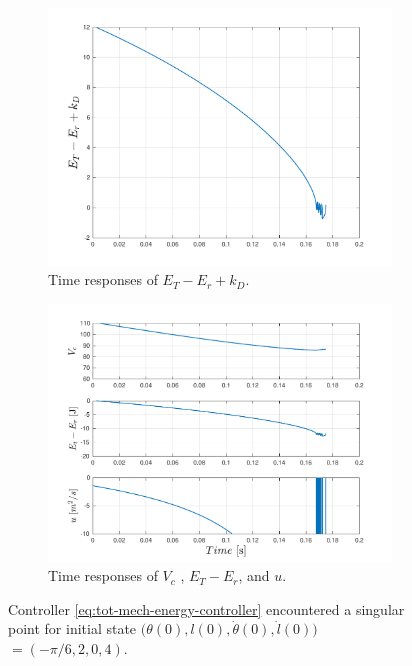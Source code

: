 \documentclass[main.tex]{subfiles}
\begin{document}
\begin{figure}[H] 
\begin{subfigure}{.5\textwidth}
  \centering
  \includegraphics[width=1\linewidth]{figures/Total_Energy_Shaping/total_2.pdf}
\caption{Time responses of $E_T-E_r+k_D$.}
\end{subfigure}
\begin{subfigure}{.5\textwidth}
  \centering
  \includegraphics[width=1\linewidth]{figures/Total_Energy_Shaping/total_1.pdf}
 \caption{Time responses of $V_c$ , $E_T-E_r$, and $u$.}
\end{subfigure}
\caption{Controller \eqref{eq:tot-mech-energy-controller} encountered a singular point for initial state $\big(\theta(0),l(0),\dot{\theta}(0),\dot{l}(0)\big)$ $= (-\pi/6,2,0,4)$.}
\label{fig:singular_controller}
\end{figure}
\newpage
\end{document}
